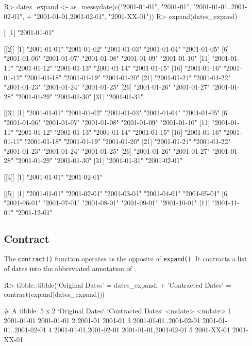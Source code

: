 \documentclass[
]{jss}
\begin{document}
\begin{CodeChunk}
\begin{CodeInput}
R> dates_expand <- as_messydate(c("2001-01-01", "2001-01", "2001-01-01..2001-02-01",
+                                "{2001-01-01,2001-02-01}", "2001-XX-01"))
R> expand(dates_expand)
\end{CodeInput}
\begin{CodeOutput}
[[1]]
[1] "2001-01-01"

[[2]]
 [1] "2001-01-01" "2001-01-02" "2001-01-03" "2001-01-04" "2001-01-05"
 [6] "2001-01-06" "2001-01-07" "2001-01-08" "2001-01-09" "2001-01-10"
[11] "2001-01-11" "2001-01-12" "2001-01-13" "2001-01-14" "2001-01-15"
[16] "2001-01-16" "2001-01-17" "2001-01-18" "2001-01-19" "2001-01-20"
[21] "2001-01-21" "2001-01-22" "2001-01-23" "2001-01-24" "2001-01-25"
[26] "2001-01-26" "2001-01-27" "2001-01-28" "2001-01-29" "2001-01-30"
[31] "2001-01-31"

[[3]]
 [1] "2001-01-01" "2001-01-02" "2001-01-03" "2001-01-04" "2001-01-05"
 [6] "2001-01-06" "2001-01-07" "2001-01-08" "2001-01-09" "2001-01-10"
[11] "2001-01-11" "2001-01-12" "2001-01-13" "2001-01-14" "2001-01-15"
[16] "2001-01-16" "2001-01-17" "2001-01-18" "2001-01-19" "2001-01-20"
[21] "2001-01-21" "2001-01-22" "2001-01-23" "2001-01-24" "2001-01-25"
[26] "2001-01-26" "2001-01-27" "2001-01-28" "2001-01-29" "2001-01-30"
[31] "2001-01-31" "2001-02-01"

[[4]]
[1] "2001-01-01" "2001-02-01"

[[5]]
 [1] "2001-01-01" "2001-02-01" "2001-03-01" "2001-04-01" "2001-05-01"
 [6] "2001-06-01" "2001-07-01" "2001-08-01" "2001-09-01" "2001-10-01"
[11] "2001-11-01" "2001-12-01"
\end{CodeOutput}
\end{CodeChunk}

\hypertarget{contract}{%
\subsection{Contract}\label{contract}}

The \texttt{contract()} function operates as the opposite of
\texttt{expand()}. It contracts a list of dates into the abbreviated
annotation of .

\begin{CodeChunk}
\begin{CodeInput}
R> tibble::tibble('Original Dates' = dates_expand,
+                'Contracted Dates' = contract(expand(dates_expand)))
\end{CodeInput}
\begin{CodeOutput}
# A tibble: 5 x 2
  `Original Dates`        `Contracted Dates`     
  <mdate>                 <mdate>                
1 2001-01-01              2001-01-01             
2 2001-01                 2001-01                
3 2001-01-01..2001-02-01  2001-01-01..2001-02-01 
4 {2001-01-01,2001-02-01} {2001-01-01,2001-02-01}
5 2001-XX-01              2001-XX-01             
\end{CodeOutput}
\end{CodeChunk}
\end{document}
